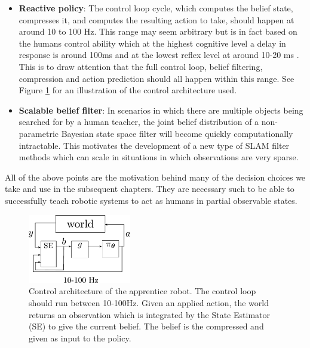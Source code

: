 \begin{itemize}

 \item \textbf{Reactive policy}: The control loop cycle, which computes the belief state, compresses it, and computes the 
 resulting action to take, should happen at around 10 to 100 Hz. This range may seem arbitrary but is in fact based on the humans control ability which at the highest
 cognitive level a delay in response is around 100ms and at the lowest reflex level at around 10-20 ms \cite{Biomechanics_2009}. This is to draw attention that the 
 full control loop, belief filtering, compression and action prediction should all happen within this range. See Figure \ref{fig:control_architecture} for 
 an illustration of the control architecture used.
 
 \item \textbf{Scalable belief filter}: In scenarios in which there are multiple objects being searched for by a human teacher, the joint belief distribution 
 of a non-parametric Bayesian state space filter will become quickly computationally intractable. This motivates the development of a new type of SLAM filter methods
 which can scale in situations in which observations are very sparse.
\end{itemize}

All of the above points are the motivation behind many of the decision choices we take and use in the subsequent chapters. 
They are necessary such to be able to successfully teach robotic systems to act as humans in partial observable states.

\begin{figure}
 \centering
 \includegraphics[width=0.4\textwidth]{./ch2-Background/Figures/control_loop.pdf}
 \caption{Control architecture of the apprentice robot. The control loop should run between 10-100Hz. Given an applied action, the world returns an observation 
 which is integrated by the State Estimator (SE) to give the current belief. The belief is the compressed and given as input to the policy.}
 \label{fig:control_architecture}
\end{figure}


